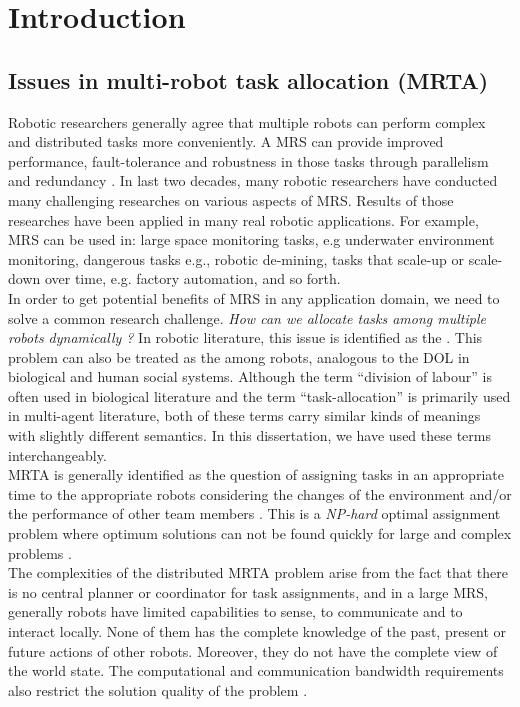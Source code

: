 \chapter{Introduction}
\label{intro}
\section{Issues in multi-robot task allocation (MRTA)}
\label{intro:mrta}
Robotic researchers generally agree that multiple robots can perform complex and distributed tasks more conveniently. A \acf{MRS} can provide improved performance, fault-tolerance and robustness in those tasks through parallelism and redundancy \cite{Arkin1998,Parker+2006,Mataric2007}. In last two decades, many robotic researchers have conducted many challenging researches on various aspects of MRS. Results of those researches have been applied   in many real robotic applications. For example, MRS can be used in: large space monitoring tasks, e.g underwater environment monitoring, dangerous tasks e.g., robotic de-mining, tasks that scale-up or scale-down over time, e.g. factory automation, and so forth.\\
In order to get potential benefits of MRS in any application domain, we need to solve a common research challenge. \textit{How can we allocate tasks among multiple robots dynamically ?} In robotic literature,  this issue is identified as the . This problem can also be treated as the  among robots, analogous to the DOL in biological  and human social systems. Although the term ``division of labour'' is often used in biological literature and the term ``task-allocation'' is primarily used in multi-agent literature, both of these terms carry similar kinds of meanings with slightly different semantics. In this dissertation, we have used these terms interchangeably.\\
MRTA is generally identified as the question of assigning tasks in an appropriate time to the appropriate robots considering the changes of the environment and/or the performance of other team members \cite{Gerkey+2003}. This is a {\em NP-hard} optimal assignment problem where optimum solutions can not be found quickly for large and complex problems \cite{Parker2008}.\\
The complexities of the distributed MRTA problem arise from the fact that there is no central planner or coordinator for task assignments, and in a large MRS, generally robots have limited capabilities to sense, to communicate and to interact locally. None of them has the complete knowledge of the past, present or future actions of other robots. Moreover, they do not have the complete view of the world state. The computational and communication bandwidth requirements also restrict the solution quality of the problem \cite{Gerkey+2004}.\\
